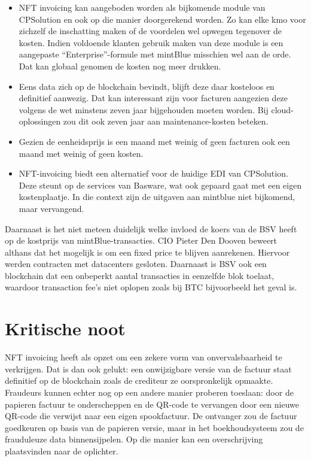 \begin{itemize}
	\item NFT invoicing kan aangeboden worden als bijkomende module van CPSolution en ook op die manier doorgerekend worden. Zo kan elke kmo voor zichzelf de inschatting maken of de voordelen wel opwegen tegenover de kosten. Indien voldoende klanten gebruik maken van deze module is een aangepaste ``Enterprise''-formule met mintBlue misschien wel aan de orde. Dat kan globaal genomen de kosten nog meer drukken.
	\item Eens data zich op de blockchain bevindt, blijft deze daar kosteloos en definitief aanwezig. Dat kan interessant zijn voor facturen aangezien deze volgens de wet minstens zeven jaar bijgehouden moeten worden. Bij cloud-oplossingen zou dit ook zeven jaar aan maintenance-kosten beteken. 
	\item Gezien de eenheidsprijs is een maand met weinig of geen facturen ook een maand met weinig of geen kosten. 
	\item NFT-invoicing biedt een alternatief voor de huidige EDI van CPSolution. Deze steunt op de services van Basware, wat ook gepaard gaat met een eigen kostenplaatje. In die context zijn de uitgaven aan mintblue niet bijkomend, maar vervangend.
\end{itemize}

Daarnaast is het niet meteen duidelijk welke invloed de koers van de BSV heeft op de kostprijs van mintBlue-transacties. CIO Pieter Den Dooven beweert althans dat het mogelijk is om een fixed price te blijven aanrekenen. Hiervoor werden contracten met datacenters gesloten. Daarnaast is BSV ook een blockchain dat een onbeperkt aantal transacties in eenzelfde blok toelaat, waardoor transaction fee's niet oplopen zoals bij BTC bijvoorbeeld het geval is.


\section{Kritische noot}
\label{sec:kritische-noot}

NFT invoicing heeft als opzet om een zekere vorm van onvervalsbaarheid te verkrijgen. Dat is dan ook gelukt: een onwijzigbare versie van de factuur staat definitief op de blockchain zoals de crediteur ze oorspronkelijk opmaakte. Fraudeurs kunnen echter nog op een andere manier proberen toeslaan: door de papieren factuur te onderscheppen en de QR-code te vervangen door een nieuwe QR-code die verwijst naar een eigen spookfactuur. De ontvanger zou de factuur goedkeuren op basis van de papieren versie, maar in het boekhoudsysteem zou de frauduleuze data binnensijpelen. Op die manier kan een overschrijving plaatsvinden naar de oplichter.

